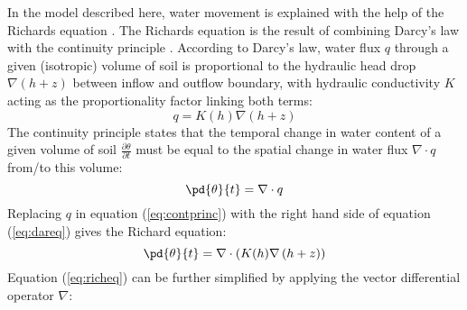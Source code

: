 In the model described here, water movement is explained with the help of the Richards equation \parencite{richards_capillary_1931}.  The Richards equation is the result of combining Darcy’s law with the continuity principle \parencite{hillel_environmental_1998}.  According to Darcy’s law, water flux $q$ through a given (isotropic) volume of soil is proportional to the hydraulic head drop $\nabla \left( h + z \right)$ between inflow and outflow boundary, with hydraulic conductivity $K$ acting as the proportionality factor linking both terms:
\begin{equation}
  \label{eq:dareq}
  q = K(h) \nabla \left( h + z \right)
\end{equation}
The continuity principle states that the temporal change in water content of a given volume of soil $\frac{\partial \theta}{\partial t}$ must be equal to the spatial change in water flux $\nabla \cdot q$ from/to this volume:
\begin{equation}
  \label{eq:contprinc}
  \pd{\theta}{t}  = \nabla \cdot q
\end{equation}
Replacing $q$ in equation (\ref{eq:contprinc}) with the right hand side of equation (\ref{eq:dareq}) gives the Richard equation:
\begin{equation}
  \label{eq:richeq}
  \pd{\theta}{t} = \nabla \cdot \left( K(h) \nabla \left( h + z \right) \right)
\end{equation}
Equation (\ref{eq:richeq}) can be further simplified by applying the vector differential operator $\nabla$: %
